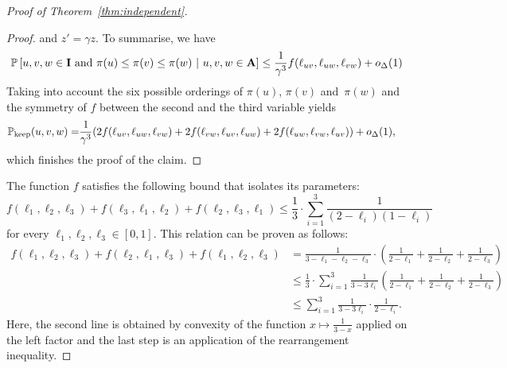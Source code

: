 \begin{proof}[Proof of Theorem~\ref{thm:independent}]
\begin{proof}
and $z'=\gamma z$.
To summarise, we have
\[
\mathbb{P}\left[u,v,w\in{\bf{I}}\text{ and }\pi(u)\le\pi(v)\le\pi(w)\,\,\middle|\,\,u,v,w\in{\bf{A}}\right]
\leq \frac{1}{\gamma^3}f(\ell_{uv},\ell_{uw},\ell_{vw}) + o_\Delta(1) 
\]
Taking into account the six possible orderings of $\pi(u)$, $\pi(v)$ and~$\pi(w)$
and the symmetry of $f$ between the second and the third variable yields
\begin{align*}
   \mathbb{P}_{\text{keep}}(u,v,w)=&\frac{1}{\gamma^3}(
   2f(\ell_{uv},\ell_{uw},\ell_{vw})+
   2f(\ell_{vw},\ell_{uv},\ell_{uw})+
   2f(\ell_{uw},\ell_{vw},\ell_{uv})
) +o_\Delta(1),
\end{align*}
which finishes the proof of the claim.
\end{proof}
The function $f$ satisfies the following bound that isolates its parameters:
\begin{equation}\label{eq:f as sum}
f(\ell_1,\ell_2,\ell_3)+f(\ell_3,\ell_1,\ell_2)+f(\ell_2,\ell_3,\ell_1) \leq
        \frac13\cdot\sum_{i=1}^3\frac{1}{(2-\ell_i)(1-\ell_i)}
\end{equation}
for every $\ell_1,\ell_2,\ell_3\in[0,1]$.
This relation can be proven as follows:
\begin{align*}
f(\ell_1,\ell_2,\ell_3)+f(\ell_2,\ell_1,\ell_3)+f(\ell_1,\ell_2,\ell_3)&=
\frac{1}{3-\ell_1-\ell_2-\ell_3}\cdot\left(\frac{1}{2-\ell_1}+\frac{1}{2-\ell_2}+\frac{1}{2-\ell_3}\right)\\
&\leq \frac13\cdot\sum_{i=1}^3\frac{1}{3-3\ell_i}\left(\frac{1}{2-\ell_1}+\frac{1}{2-\ell_2}+\frac{1}{2-\ell_3}\right)\\
&\leq \sum_{i=1}^3\frac{1}{3-3\ell_i}\cdot\frac{1}{2-\ell_i}.
\end{align*}
Here, the second line is obtained by convexity of the function $x\mapsto\frac{1}{3-x}$
applied on the left factor and the last step is an application of the rearrangement inequality.


\end{proof}
